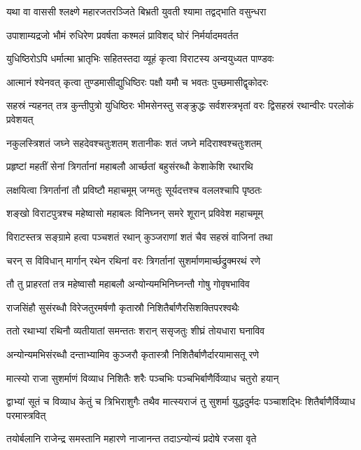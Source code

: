 \twolineshloka
{यथा वा वाससी श्लक्ष्णे महारजतरञ्जिते}
{बिभ्रती युवती श्यामा तद्वद्भाति वसुन्धरा}


\twolineshloka
{उपाशाम्यद्रजो भौमं रुधिरेण प्रवर्षता}
{कश्मलं प्राविशद् घोरं निर्मर्यादमवर्तत}


\twolineshloka
{युधिष्ठिरोऽपि धर्मात्मा भ्रातृभिः सहितस्तदा}
{व्यूहं कृत्वा विराटस्य अन्वयुध्यत पाण्डवः}


\twolineshloka
{आत्मानं श्येनवत् कृत्वा तुण्डमासीद्युधिष्ठिरः}
{पक्षौ यमौ च भवतः पुच्छमासीद्वृकोदरः}


\threelineshloka
{सहस्रं न्यहनत् तत्र कुन्तीपुत्रो युधिष्ठिरः}
{भीमसेनस्तु सङ्क्रुद्धः सर्वशस्त्रभृतां वरः}
{द्विसहस्रं रथान्वीरः परलोकं प्रवेशयत्}


\twolineshloka
{नकुलस्त्रिशतं जघ्ने सहदेवश्चतुःशतम्}
{शतानीकः शतं जघ्ने मदिराश्वश्चतुःशतम्}


\twolineshloka
{प्रहृष्टां महतीं सेनां त्रिगर्तानां महाबलौ}
{आर्च्छतां बहुसंरब्धौ केशाकेशि रथारथि}


\twolineshloka
{लक्षयित्वा त्रिगर्तानां तौ प्रविष्टौ महाचमूम्}
{जग्मतुः सूर्यदत्तश्च वललश्चापि पृष्ठतः}


\twolineshloka
{शङ्खो विराटपुत्रश्च महेष्वासो महाबलः}
{विनिघ्नन् समरे शूरान् प्रविवेश महाचमूम्}


\twolineshloka
{विराटस्तत्र सङ्ग्रामे हत्वा पञ्चशतं रथान्}
{कुञ्जराणां शतं चैव सहस्रं वाजिनां तथा}


\twolineshloka
{चरन् स विविधान् मार्गान् रथेन रथिनां वरः}
{त्रिगर्तानां सुशर्माणमार्च्छद्रुक्मरथं रणे}


\twolineshloka
{तौ तु प्राहरतां तत्र महेष्वासौ महाबलौ}
{अन्योन्यमभिनिघ्नन्तौ गोषु गोवृषभाविव}


\twolineshloka
{राजसिंहौ सुसंरब्धौ विरेजतुरमर्षणौ}
{कृतास्रौ निशितैर्बाणैरसिशक्तिपरश्वथैः}


\twolineshloka
{ततो रथाभ्यां रथिनौ व्यतीयातां समन्ततः}
{शरान् ससृजतुः शीघ्रं तोयधारा घनाविव}


\twolineshloka
{अन्योन्यमभिसंरब्धौ दन्ताभ्यामिव कुञ्जरौ}
{कृतास्त्रौ निशितैर्बाणैर्दारयामासतू रणे}


\twolineshloka
{मात्स्यो राजा सुशर्माणं विव्याध निशितैः शरैः}
{पञ्चभिः पञ्चभिर्बाणैर्विव्याध चतुरो हयान्}


\threelineshloka
{द्वाभ्यां सूतं च विव्याध केतुं च त्रिभिराशुगैः}
{तथैव मात्स्यराजं तु सुशर्मा युद्धदुर्मदः}
{पञ्चाशद्भिः शितैर्बाणैर्विव्याध परमास्त्रवित्}


\twolineshloka
{तयोर्बलानि राजेन्द्र समस्तानि महारणे}
{नाजानन्त तदाऽन्योन्यं प्रदोषे रजसा वृते}

